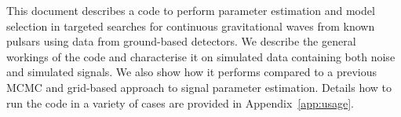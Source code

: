 This document describes a code to perform parameter estimation and model selection in targeted
searches for continuous gravitational waves from known pulsars using data from ground-based \gw detectors.
We describe the general workings of the code and characterise it on simulated data containing both noise and
simulated signals. We also show how it performs compared to a previous MCMC and grid-based
approach to signal parameter estimation. Details how to run the code in a variety of
cases are provided in Appendix~\ref{app:usage}.